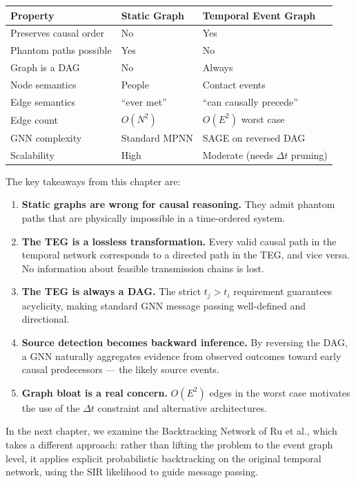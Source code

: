 \begin{center}
\begin{tabular}{lll}
\toprule
\textbf{Property} & \textbf{Static Graph} & \textbf{Temporal Event Graph} \\
\midrule
Preserves causal order & No & Yes \\
Phantom paths possible & Yes & No \\
Graph is a DAG & No & Always \\
Node semantics & People & Contact events \\
Edge semantics & ``ever met'' & ``can causally precede'' \\
Edge count & $O(N^2)$ & $O(E^2)$ worst case \\
GNN complexity & Standard MPNN & SAGE on reversed DAG \\
Scalability & High & Moderate (needs $\Delta t$ pruning) \\
\bottomrule
\end{tabular}
\end{center}

\medskip

The key takeaways from this chapter are:

\begin{enumerate}
    \item \textbf{Static graphs are wrong for causal reasoning.} They admit
          phantom paths that are physically impossible in a time-ordered system.
    \item \textbf{The TEG is a lossless transformation.} Every valid causal path
          in the temporal network corresponds to a directed path in the TEG, and
          vice versa. No information about feasible transmission chains is lost.
    \item \textbf{The TEG is always a DAG.} The strict $t_j > t_i$ requirement
          guarantees acyclicity, making standard GNN message passing well-defined
          and directional.
    \item \textbf{Source detection becomes backward inference.} By reversing the
          DAG, a GNN naturally aggregates evidence from observed outcomes toward
          early causal predecessors --- the likely source events.
    \item \textbf{Graph bloat is a real concern.} $O(E^2)$ edges in the worst
          case motivates the use of the $\Delta t$ constraint and alternative
          architectures.
\end{enumerate}

In the next chapter, we examine the Backtracking Network of Ru et al., which
takes a different approach: rather than lifting the problem to the event graph
level, it applies explicit probabilistic backtracking on the original temporal
network, using the SIR likelihood to guide message passing.
